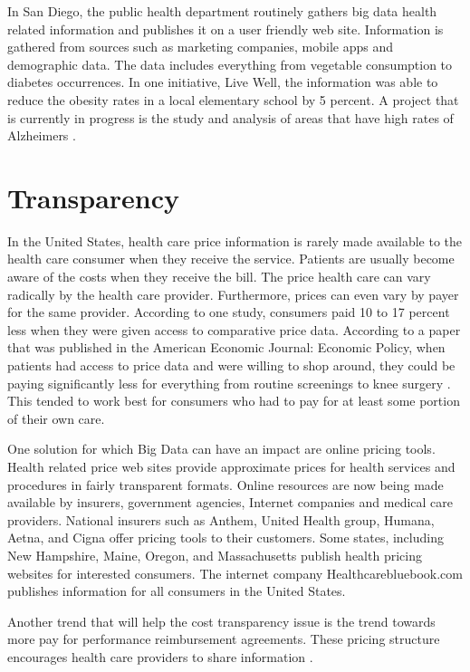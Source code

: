 \documentclass[sigconf]{acmart}
\begin{document}
{In San Diego, the public health department routinely gathers big data health related information and publishes it on a user friendly web site. Information is gathered from sources such as marketing companies, mobile apps and demographic data.  The data includes everything from vegetable consumption to diabetes occurrences.  In one initiative, Live Well, the information was able to reduce the obesity rates in a local elementary school by 5 percent. A project that is currently in progress is the study and analysis of areas that have high rates of Alzheimers \cite{www-google-sandiego}. 


\section{Transparency}
In the United States, health care price information is rarely made available to the health care consumer when they receive the service. Patients are usually become aware of the costs when they receive the bill. The price health care can vary radically by the health care provider. Furthermore, prices can even vary by payer for the same provider.  According to one study, consumers paid 10 to 17 percent less when they were given access to comparative price data.  According to a paper that was published in the American Economic Journal: Economic Policy, when patients had access to price data and were willing to shop around, they could be paying significantly less for everything from routine screenings to knee surgery \cite{www-google-transparent}.  This tended to work best for consumers who had to pay for at least some portion of their own care. 

One solution for which Big Data can have an impact are online pricing tools.  Health related price web sites provide approximate prices for health services and procedures in fairly transparent formats. Online resources are now being made available by insurers, government agencies, Internet companies and medical care providers. National insurers such as Anthem, United Health group, Humana, Aetna, and Cigna offer pricing tools to their customers. Some states, including New Hampshire, Maine, Oregon, and Massachusetts publish health pricing websites for interested consumers. The internet company Healthcarebluebook.com publishes information for all consumers in the United States.  

Another trend that will help the cost transparency issue is the trend towards more pay for performance reimbursement agreements. These pricing structure encourages health care providers to share information \cite{www-google-christian}. 

}
\end{document}

